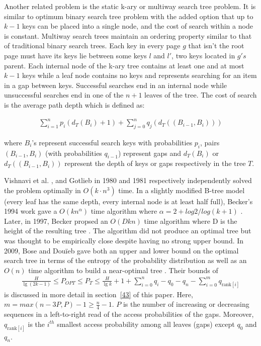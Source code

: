 \documentclass[letterpaper,12pt,titlepage,oneside,final]{book}
\theoremstyle{plain}
\begin{document}
Another related problem is the static k-ary or multiway search tree problem. It is similar to optimum binary search tree problem with the added option that up to $k-1$ keys can be placed into a single node, and the cost of search within a node is constant. Multiway search trees maintain an ordering property similar to that of traditional binary search trees. Each key in every page $g$ that isn't the root page must have its keys lie between some keys $l$ and $l'$, two keys located in $g's$ parent. Each internal node of the k-ary tree contains at least one and at most $k-1$ keys while a leaf node contains no keys and represents searching for an item in a gap between keys. Successful searches end in an internal node while unsuccessful searches end in one of the $n+1$ leaves of the tree. The cost of search is the average path depth which is defined as:

\begin{align*}
\sum_{i=1}^{n} p_i(d_T(B_i)+1) + \sum_{j=0}^{n} q_j(d_T((B_{i-1},B_i)))
\end{align*}

\noindent where $B_i$'s represent successful search keys with probabilities $p_i$, pairs $(B_{i-1},B_i)$ (with probabilities $q_{i-1}$) represent gaps and $d_T(B_i)$  or $d_T((B_{i-1},B_i))$ represent the depth of keys or gaps respectively in the tree $T$.

Vishnavi et al. \cite{vaishnavi1980optimum}, and Gotlieb  \cite{gotlieb1981optimal} in 1980 and 1981 respectively independently solved the problem optimally in $O(k\cdot n^3)$ time. In a slightly modified B-tree model (every leaf has the same depth, every internal node is at least half full), Becker's 1994 work gave a $O(kn^{\alpha})$ time algorithm where $\alpha=2+log2/log(k+1)$ \cite{becker1994new}. Later, in 1997, Becker propsed an $O(Dkn)$ time algorithm where D is the height of the resulting tree \cite{becker1997construction}. The algorithm did not produce an optimal tree but was thought to be empirically close despite having no strong upper bound. In 2009, Bose and Dou\"{i}eb gave both an upper and lower bound on the optimal search tree in terms of the entropy of the probability distribution as well as an $O(n)$ time algorithm to build a near-optimal tree \cite{bose2009efficient}. Their bounds of
\begin{align*}
\frac{H}{\lg(2k-1)} \leq P_{OPT} \leq P_T \leq \frac{H}{\lg k} + 1 + \sum_{i=0}^n q_i - q_0 - q_n - \sum_{i=0}^m q_{\text{rank}[i]}
\end{align*}
is discussed in more detail in section~\ref{43} of this paper. Here, $m=max({n-3P,P})-1 \geq \frac{n}{4} - 1$. $P$ is the number of increasing or decreasing sequences in a left-to-right read of the access probabilities of the gaps. Moreover, $q_{\text{rank}[i]}$ is the $i^{th}$ smallest access probability among all leaves (gaps) except $q_0$ and $q_n$.
\end{document}

